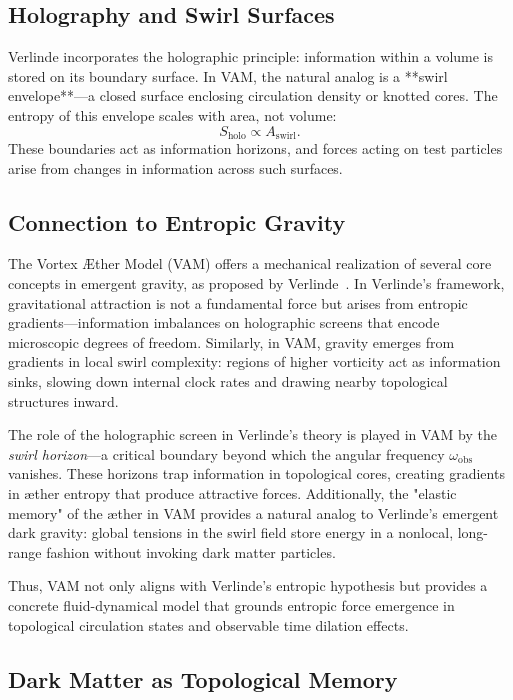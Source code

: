 \subsection*{Holography and Swirl Surfaces}

Verlinde incorporates the holographic principle: information within a volume is stored on its boundary surface. In VAM, the natural analog is a **swirl envelope**—a closed surface enclosing circulation density or knotted cores. The entropy of this envelope scales with area, not volume:
\begin{equation}
S_{\text{holo}} \propto A_{\text{swirl}}.
\end{equation}
These boundaries act as information horizons, and forces acting on test particles arise from changes in information across such surfaces.

\subsection*{Connection to Entropic Gravity}

The Vortex Æther Model (VAM) offers a mechanical realization of several core concepts in emergent gravity, as proposed by Verlinde~\cite{verlinde2017emergent}. In Verlinde’s framework, gravitational attraction is not a fundamental force but arises from entropic gradients—information imbalances on holographic screens that encode microscopic degrees of freedom. Similarly, in VAM, gravity emerges from gradients in local swirl complexity: regions of higher vorticity act as information sinks, slowing down internal clock rates and drawing nearby topological structures inward.

The role of the holographic screen in Verlinde’s theory is played in VAM by the \emph{swirl horizon}—a critical boundary beyond which the angular frequency $\omega_\text{obs}$ vanishes. These horizons trap information in topological cores, creating gradients in æther entropy that produce attractive forces. Additionally, the "elastic memory" of the æther in VAM provides a natural analog to Verlinde’s emergent dark gravity: global tensions in the swirl field store energy in a nonlocal, long-range fashion without invoking dark matter particles.

Thus, VAM not only aligns with Verlinde’s entropic hypothesis but provides a concrete fluid-dynamical model that grounds entropic force emergence in topological circulation states and observable time dilation effects.


\subsection*{Dark Matter as Topological Memory}

